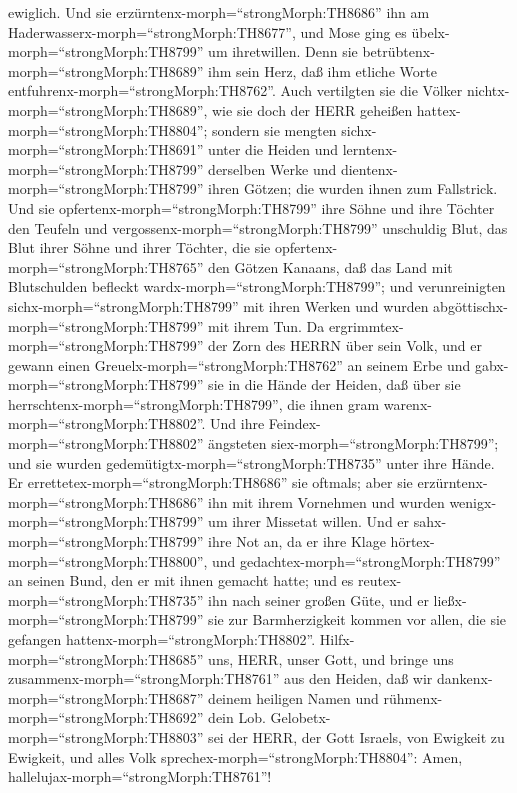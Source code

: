 ewiglich.  Und sie erzürntenx-morph=``strongMorph:TH8686''
ihn am Haderwasserx-morph=``strongMorph:TH8677'', und Mose ging es
übelx-morph=``strongMorph:TH8799'' um ihretwillen.  Denn
sie betrübtenx-morph=``strongMorph:TH8689'' ihm sein Herz, daß ihm
etliche Worte entfuhrenx-morph=``strongMorph:TH8762''. 
Auch vertilgten sie die Völker nichtx-morph=``strongMorph:TH8689'', wie
sie doch der HERR geheißen hattex-morph=``strongMorph:TH8804'';
 sondern sie mengten sichx-morph=``strongMorph:TH8691''
unter die Heiden und lerntenx-morph=``strongMorph:TH8799'' derselben
Werke  und dientenx-morph=``strongMorph:TH8799'' ihren
Götzen; die wurden ihnen zum Fallstrick.  Und sie
opfertenx-morph=``strongMorph:TH8799'' ihre Söhne und ihre Töchter den
Teufeln  und vergossenx-morph=``strongMorph:TH8799''
unschuldig Blut, das Blut ihrer Söhne und ihrer Töchter, die sie
opfertenx-morph=``strongMorph:TH8765'' den Götzen Kanaans, daß das Land
mit Blutschulden befleckt wardx-morph=``strongMorph:TH8799'';
 und verunreinigten sichx-morph=``strongMorph:TH8799'' mit
ihren Werken und wurden abgöttischx-morph=``strongMorph:TH8799'' mit
ihrem Tun.  Da ergrimmtex-morph=``strongMorph:TH8799'' der
Zorn des HERRN über sein Volk, und er gewann einen
Greuelx-morph=``strongMorph:TH8762'' an seinem Erbe  und
gabx-morph=``strongMorph:TH8799'' sie in die Hände der Heiden, daß über
sie herrschtenx-morph=``strongMorph:TH8799'', die ihnen gram
warenx-morph=``strongMorph:TH8802''.  Und ihre
Feindex-morph=``strongMorph:TH8802'' ängsteten
siex-morph=``strongMorph:TH8799''; und sie wurden
gedemütigtx-morph=``strongMorph:TH8735'' unter ihre Hände. 
Er errettetex-morph=``strongMorph:TH8686'' sie oftmals; aber sie
erzürntenx-morph=``strongMorph:TH8686'' ihn mit ihrem Vornehmen und
wurden wenigx-morph=``strongMorph:TH8799'' um ihrer Missetat willen.
 Und er sahx-morph=``strongMorph:TH8799'' ihre Not an, da
er ihre Klage hörtex-morph=``strongMorph:TH8800'',  und
gedachtex-morph=``strongMorph:TH8799'' an seinen Bund, den er mit ihnen
gemacht hatte; und es reutex-morph=``strongMorph:TH8735'' ihn nach
seiner großen Güte,  und er
ließx-morph=``strongMorph:TH8799'' sie zur Barmherzigkeit kommen vor
allen, die sie gefangen hattenx-morph=``strongMorph:TH8802''.
 Hilfx-morph=``strongMorph:TH8685'' uns, HERR, unser Gott,
und bringe uns zusammenx-morph=``strongMorph:TH8761'' aus den Heiden,
daß wir dankenx-morph=``strongMorph:TH8687'' deinem heiligen Namen und
rühmenx-morph=``strongMorph:TH8692'' dein Lob. 
Gelobetx-morph=``strongMorph:TH8803'' sei der HERR, der Gott Israels,
von Ewigkeit zu Ewigkeit, und alles Volk
sprechex-morph=``strongMorph:TH8804'': Amen,
hallelujax-morph=``strongMorph:TH8761''!

